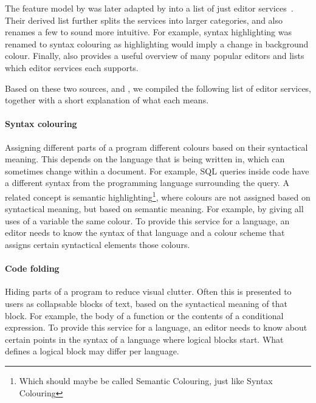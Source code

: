 The feature model by \citeauthor{ErdwegSV13} was later adapted by \citeauthor{Pelsmaeker2018} into a list of just editor services~\autocite{Pelsmaeker2018}.
Their derived list further splits the services into larger categories, and also renames a few to sound more intuitive.
For example, syntax highlighting was renamed to syntax colouring as highlighting would imply a change in background colour.
Finally, \citeauthor{Pelsmaeker2018} also provides a useful overview of many popular editors and lists which editor services each supports.

Based on these two sources, \citeauthor{ErdwegSV13} and \citeauthor{Pelsmaeker2018}, we compiled the following list of editor services, together with a short explanation of what each means.

\paragraph{Syntax colouring}
Assigning different parts of a program different colours based on their syntactical meaning.
This depends on the language that is being written in, which can sometimes change within a document.
For example, SQL queries inside code have a different syntax from the programming language surrounding the query.
A related concept is semantic highlighting\footnote{Which should maybe be called Semantic Colouring, just like Syntax Colouring},
where colours are not assigned based on syntactical meaning, but based on semantic meaning.
For example, by giving all uses of a variable the same colour.
To provide this service for a language, an editor needs to know the syntax of that language and a colour scheme that assigns certain syntactical elements those colours.

\paragraph{Code folding}
Hiding parts of a program to reduce visual clutter.
Often this is presented to users as collapsable blocks of text, based on the syntactical meaning of that block.
For example, the body of a function or the contents of a conditional expression.
To provide this service for a language, an editor needs to know about certain points in the syntax of a language where logical blocks start.
What defines a logical block may differ per language.

